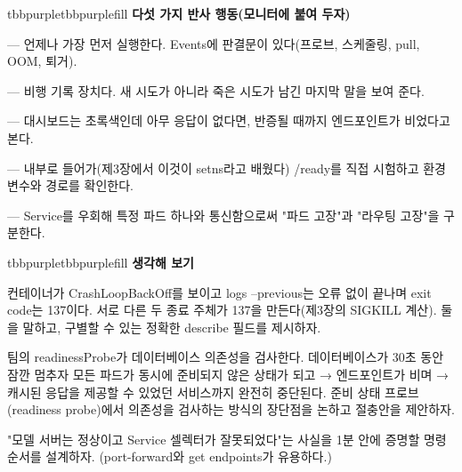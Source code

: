 \begin{calloutbox}{tbbpurple}{tbbpurplefill}
{\normalsize\bfseries\color{tbbpurple}다섯 가지 반사 행동(모니터에 붙여 두자)}\par\vspace{3pt}
\begin{tbbitemize}
  \item {} — 언제나 가장 먼저 실행한다. Events에 판결문이 있다(프로브, 스케줄링, pull, OOM, 퇴거).
  \item {} — 비행 기록 장치다. 새 시도가 아니라 죽은 시도가 남긴 마지막 말을 보여 준다.
  \item {} — 대시보드는 초록색인데 아무 응답이 없다면, 반증될 때까지 엔드포인트가 비었다고 본다.
  \item {} — 내부로 들어가(제3장에서 이것이 setns라고 배웠다) /ready를 직접 시험하고 환경 변수와 경로를 확인한다.
  \item {} — Service를 우회해 특정 파드 하나와 통신함으로써 "파드 고장"과 "라우팅 고장"을 구분한다.
\end{tbbitemize}
\end{calloutbox}

\vspace{3.0pt}

\begin{calloutbox}{tbbpurple}{tbbpurplefill}
{\normalsize\bfseries\color{tbbpurple}생각해 보기}\par\vspace{3pt}
\begin{tbbitemize}
  \item 컨테이너가 CrashLoopBackOff를 보이고 logs --previous는 오류 없이 끝나며 exit code는 137이다. 서로 다른 두 종료 주체가 137을 만든다(제3장의 SIGKILL 계산). 둘을 말하고, 구별할 수 있는 정확한 describe 필드를 제시하자.
  \item 팀의 readinessProbe가 데이터베이스 의존성을 검사한다. 데이터베이스가 30초 동안 잠깐 멈추자 모든 파드가 동시에 준비되지 않은 상태가 되고 → 엔드포인트가 비며 → 캐시된 응답을 제공할 수 있었던 서비스까지 완전히 중단된다. 준비 상태 프로브(readiness probe)에서 의존성을 검사하는 방식의 장단점을 논하고 절충안을 제안하자.
  \item "모델 서버는 정상이고 Service 셀렉터가 잘못되었다"는 사실을 1분 안에 증명할 명령 순서를 설계하자. (port-forward와 get endpoints가 유용하다.)
\end{tbbitemize}
\end{calloutbox}

